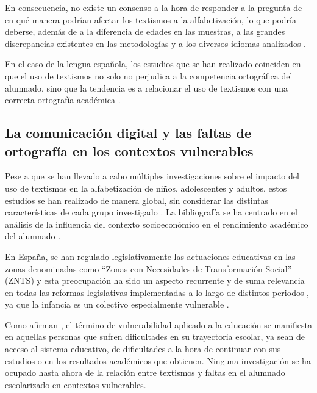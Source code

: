 \documentclass[spanish]{textolivre}
\begin{document}
En consecuencia, no existe un consenso a la hora de responder a la pregunta de en qué manera podrían afectar los textismos a la alfabetización, lo que podría deberse, además de a la diferencia de edades en las muestras, a las grandes discrepancias existentes en las metodologías y a los diversos idiomas analizados \cite{fernandez_julia_textisms_2023,verheijen_effects_2013}.

En el caso de la lengua española, los estudios que se han realizado coinciden en que el uso de textismos no solo no perjudica a la competencia ortográfica del alumnado, sino que la tendencia es a relacionar el uso de textismos con una correcta ortografía académica \cite{gomez-camacho_youth_2023b,gomez_camacho_norma_2017}.

\subsection{La comunicación digital y las faltas de ortografía en los contextos vulnerables}

Pese a que se han llevado a cabo múltiples investigaciones sobre el impacto del uso de textismos en la alfabetización de niños, adolescentes y adultos, estos estudios se han realizado de manera global, sin considerar las distintas características de cada grupo investigado \cite{gomez-camacho_ke_2023a,parrella_measuring_2021,verheijen_relationships_2020}. La bibliografía se ha centrado en el análisis de la influencia del contexto socioeconómico en el rendimiento académico del alumnado \cite{escarbajal_frutos_rendimiento_2019,tique-gutierrez_contexto_2018}. 

En España, se han regulado legislativamente las actuaciones educativas en las zonas denominadas como “Zonas con Necesidades de Transformación Social” (ZNTS) y esta preocupación ha sido un aspecto recurrente y de suma relevancia en todas las reformas legislativas implementadas a lo largo de distintos periodos \cite{arredondo2018zonas}, ya que la infancia es un colectivo especialmente vulnerable \cite[p. 91]{martin_hierro_aprendizaje_2020}.

Como afirman \textcite[p. 181]{gomez-jarabo_vulnerables_2023}, el término de vulnerabilidad aplicado a la educación se manifiesta en aquellas personas que sufren dificultades en su trayectoria escolar, ya sean de acceso al sistema educativo, de dificultades a la hora de continuar con sus estudios o en los resultados académicos que obtienen. Ninguna investigación se ha ocupado hasta ahora de la relación entre textismos y faltas en el alumnado escolarizado en contextos vulnerables.
\end{document}

